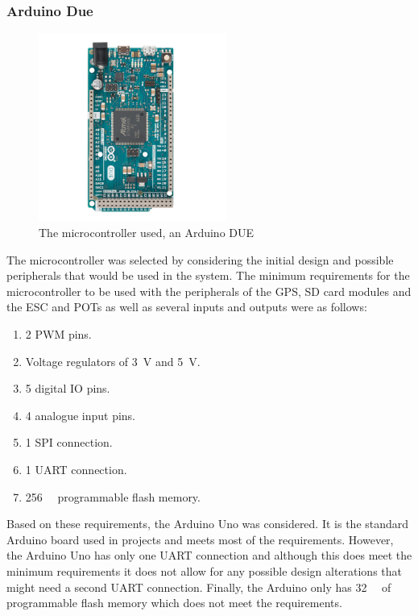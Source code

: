 		\subsubsection{Arduino Due}\par
		\begin{figure}[!ht]
			\begin{center}
				\includegraphics[width = 0.55\textwidth]{figures/DUE.jpg}
				\caption{The microcontroller used, an Arduino DUE}
				\label{fig:3:due}
			\end{center}
		\end{figure}
		The microcontroller was selected by considering the initial design and possible peripherals that would be used in the system. The minimum requirements for the microcontroller to be used with the peripherals of the GPS, SD card modules and the ESC and POTs as well as several inputs and outputs were as follows:
		\begin{enumerate}
			\item 2 PWM pins.
			\item Voltage regulators of \SI{3}{\volt} and \SI{5}{\volt}.
			\item 5 digital IO pins.
			\item 4 analogue input pins.
			\item 1 SPI connection.
			\item 1 UART connection.
			\item \SI{256}{\kilo\byte} programmable flash memory.		
		\end{enumerate}
		Based on these requirements, the Arduino Uno was considered. It is the standard Arduino board used in projects and meets most of the requirements. However, the Arduino Uno has only one UART connection and although this does meet the minimum requirements it does not allow for any possible design alterations that might need a second UART connection. Finally, the Arduino only has \SI{32}{\kilo\byte} of programmable flash memory which does not meet the requirements.\par 

